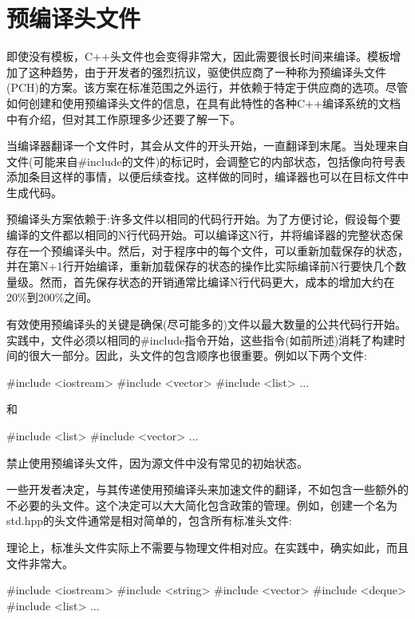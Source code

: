\section{预编译头文件}

即使没有模板，C++头文件也会变得非常大，因此需要很长时间来编译。模板增加了这种趋势，由于开发者的强烈抗议，驱使供应商了一种称为预编译头文件(PCH)的方案。该方案在标准范围之外运行，并依赖于特定于供应商的选项。尽管如何创建和使用预编译头文件的信息，在具有此特性的各种C++编译系统的文档中有介绍，但对其工作原理多少还要了解一下。

当编译器翻译一个文件时，其会从文件的开头开始，一直翻译到末尾。当处理来自文件(可能来自\#include的文件)的标记时，会调整它的内部状态，包括像向符号表添加条目这样的事情，以便后续查找。这样做的同时，编译器也可以在目标文件中生成代码。

预编译头方案依赖于:许多文件以相同的代码行开始。为了方便讨论，假设每个要编译的文件都以相同的N行代码开始。可以编译这N行，并将编译器的完整状态保存在一个预编译头中。然后，对于程序中的每个文件，可以重新加载保存的状态，并在第N+1行开始编译，重新加载保存的状态的操作比实际编译前N行要快几个数量级。然而，首先保存状态的开销通常比编译N行代码更大，成本的增加大约在20\%到200\%之间。

有效使用预编译头的关键是确保(尽可能多的)文件以最大数量的公共代码行开始。实践中，文件必须以相同的\#include指令开始，这些指令(如前所述)消耗了构建时间的很大一部分。因此，头文件的包含顺序也很重要。例如以下两个文件:

\begin{cpp}
#include <iostream>
#include <vector>
#include <list>
...
\end{cpp}

和

\begin{cpp}
#include <list>
#include <vector>
...
\end{cpp}

禁止使用预编译头文件，因为源文件中没有常见的初始状态。

一些开发者决定，与其传递使用预编译头来加速文件的翻译，不如包含一些额外的不必要的头文件。这个决定可以大大简化包含政策的管理。例如，创建一个名为std.hpp的头文件通常是相对简单的，包含所有标准头文件:

\begin{notice}
理论上，标准头文件实际上不需要与物理文件相对应。在实践中，确实如此，而且文件非常大。
\end{notice}

\begin{cpp}
#include <iostream>
#include <string>
#include <vector>
#include <deque>
#include <list>
...
\end{cpp}

